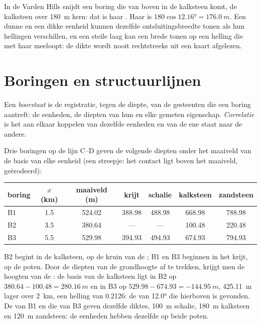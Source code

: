 In de Varden Hills snijdt een boring die van boven in de kalksteen komt, de kalksteen over \qty{180}{m} kern: dat is haar . Haar  is $180\cos\ang{12.16} = \qty{176.0}{m}$. Een dunne en een dikke eenheid kunnen dezelfde ontsluitingsbreedte
tonen als hun hellingen verschillen, en een steile laag kan een brede  tonen op een helling die met
haar meeloopt: de dikte wordt nooit rechtstreeks uit een kaart afgelezen.

\section{Boringen en structuurlijnen}\label{sec:b1:cross-sections:boreholes}

\begin{definition}\label{def:b1:cross-sections:log}
Een \emph{boorstaat} is de registratie, tegen de diepte, van de gesteenten die een boring
aantreft: de eenheden, de diepten van hun  en elke gemeten eigenschap. \emph{Correlatie}
is het aan elkaar koppelen van dezelfde eenheden en  van de ene staat naar de andere.
\end{definition}

Drie boringen op de lijn C--D geven de volgende diepten onder het maaiveld van de basis van elke eenheid (een
streepje: het contact ligt boven het maaiveld, geërodeerd):
\begin{center}
\small
\begin{tabular}{lcccccc}
\hline
boring & $x$ (km) & maaiveld (m) & krijt & schalie & kalksteen & zandsteen \\
\hline
B1 & 1.5 & 524.02 & 388.98 & 488.98 & 668.98 & 788.98 \\
B2 & 3.5 & 380.64 & --- & --- & 100.48 & 220.48 \\
B3 & 5.5 & 529.98 & 394.93 & 494.93 & 674.93 & 794.93 \\
\hline
\end{tabular}
\end{center}
B2 begint in de kalksteen, op de kruin van de ; B1 en B3 beginnen in het krijt, op de poten. Door de
diepten van de grondhoogte af te trekken, krijgt men de hoogten van de : de basis van de kalksteen ligt in
B2 op $380.64 - 100.48 = \qty{280.16}{m}$ en in B3 op $529.98 - 674.93 =
\qty{-144.95}{m}$, \qty{425.11}{m} lager over \qty{2}{km}, een helling van \num{0.2126}: de  van
\ang{12.0} die hierboven is gevonden. De  van B1 en die van B3 geven dezelfde diktes, \qty{100}{m} schalie, \qty{180}{m} kalksteen en
\qty{120}{m} zandsteen: de eenheden hebben dezelfde  op beide poten.

